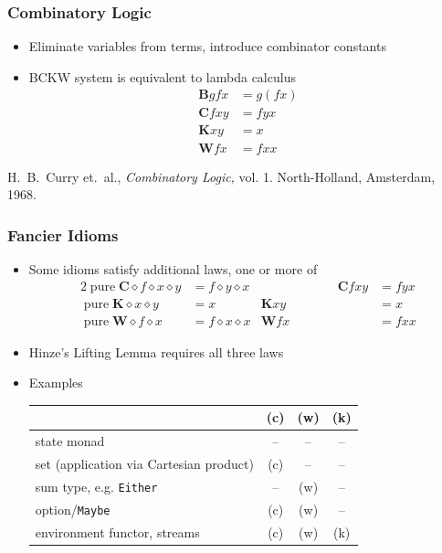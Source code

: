 \documentclass[smaller,leqno]{beamer}
\newenvironment{reference}{\begingroup\scriptsize\singlespacing\color{gray}}{\par\endgroup}
\DeclareMathOperator{\pure}{pure}
\newcommand{\ap}{\diamond}
\begin{document}
\begin{frame}
\frametitle{Combinatory Logic}

\begin{itemize}
\item Eliminate variables from terms, introduce combinator constants
\item BCKW system is equivalent to lambda calculus
\begin{align*}
\mathbf{B} g f x &= g (f x) \\
\mathbf{C} f x y &= f y x \\
\mathbf{K} x y &= x \\
\mathbf{W} f x &= f x x
\end{align*}
\end{itemize}

\vspace{\fill}
\begin{reference}
H.\ B.\ Curry et.\ al., \emph{Combinatory Logic,} vol. 1.
North-Holland, Amsterdam, 1968.
\end{reference}
\end{frame}

\begin{frame}
\frametitle{Fancier Idioms}

\begin{itemize}
\item Some idioms satisfy additional laws, one or more of
\begin{alignat*}{2}
\pure \mathbf{C} \ap f \ap x \ap y &= f \ap y \ap x \tag{c} &\hspace{6em} \mathbf{C} f x y &= f y x \\
\pure \mathbf{K} \ap x \ap y &= x \tag{k} & \mathbf{K} x y &= x \\
\pure \mathbf{W} \ap f \ap x &= f \ap x \ap x \tag{w} & \mathbf{W} f x &= f x x
\end{alignat*}
\item Hinze's Lifting Lemma requires all three laws
\item Examples

\vspace{1mm}
\begin{tabular}{lccc}
 & (c) & (w) & (k) \\\hline
state monad & -- & -- & -- \\
set (application via Cartesian product) & (c) & -- & -- \\
sum type, e.g. \lstinline|Either| & -- & (w) & -- \\
option/\lstinline|Maybe| & (c) & (w) & -- \\
environment functor, streams & (c) & (w) & (k)
\end{tabular}
\end{itemize}
\end{frame}
\end{document}
